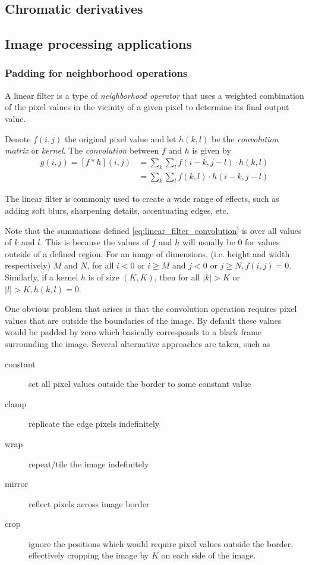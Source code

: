 \documentclass[12pt]{article} %
\theoremstyle{plain}
\theoremstyle{definition}
\theoremstyle{remark}
\begin{document}
\subsection{Chromatic derivatives}

\subsection{Image processing applications}

\subsubsection{Padding for neighborhood operations}

A linear filter is a type of \emph{neighborhood operator} that uses a weighted 
combination of the pixel values in the vicinity of a given pixel to determine 
its final output value.

Denote $f(i, j)$ the original pixel value and let $h(k, l)$ be the 
\emph{convolution matrix} or \emph{kernel}. The \emph{convolution} between 
$f$ and $h$ is given by
\begin{align} \label{eq:linear_filter_convolution}
  g(i, j) = [f \ast h](i, j)  &= \sum_k \sum_l f(i-k, j-l) \cdot h(k, l) \\
                &= \sum_k \sum_l f(k, l) \cdot h(i-k, j-l)  \nonumber
\end{align}

The linear filter is commonly used to create a wide range of effects, 
such as adding  soft blurs, sharpening details, accentuating edges, etc.

Note that the summations defined \cref{eq:linear_filter_convolution} is over
all values of $k$ and $l$. This is because the values of $f$ and $h$ will usually
be 0 for values outside of a defined region. For an image of dimensions, (i.e.
height and width respectively) $M$ and $N$, for all $i<0$ or $i \geq M$ and $j<0$ 
or $j \geq N, f(i,j)=0$. Similarly, if a kernel $h$ is of size $(K, K)$, then for
all $|k|>K$ or $|l|>K, h(k,l)=0$.  

One obvious problem that arises is that the convolution operation requires 
pixel values that are outside the boundaries of the image. By default these
values would be padded by zero which basically corresponds to a black frame
surrounding the image. Several alternative approaches are taken, such 
as

\begin{description}
  \item[constant] set all pixel values outside the border to some constant value
  \item[clamp] replicate the edge pixels indefinitely
  \item[wrap] repeat/tile the image indefinitely
  \item[mirror] reflect pixels across image border
  \item[crop] ignore the positions which would require pixel values outside the border,
    effectively cropping the image by $K$ on each side of the image.
\end{description}
\end{document}
